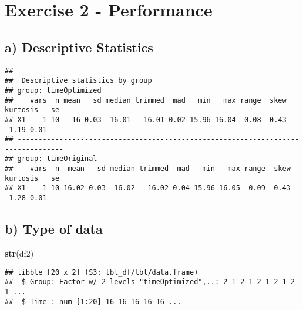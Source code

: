 \documentclass[
]{article}
\newenvironment{Shaded}{\begin{snugshade}}{\end{snugshade}}
\newcommand{\KeywordTok}[1]{\textcolor[rgb]{0.13,0.29,0.53}{\textbf{#1}}}
\newcommand{\NormalTok}[1]{#1}
\newcommand{\OperatorTok}[1]{\textcolor[rgb]{0.81,0.36,0.00}{\textbf{#1}}}
\begin{document}
\hypertarget{exercise-2---performance}{%
\section{Exercise 2 - Performance}\label{exercise-2---performance}}

\hypertarget{a-descriptive-statistics}{%
\subsection{a) Descriptive Statistics}\label{a-descriptive-statistics}}

\begin{Shaded}
\end{Shaded}

\begin{verbatim}
## 
##  Descriptive statistics by group 
## group: timeOptimized
##    vars  n mean   sd median trimmed  mad   min   max range  skew kurtosis   se
## X1    1 10   16 0.03  16.01   16.01 0.02 15.96 16.04  0.08 -0.43    -1.19 0.01
## --------------------------------------------------------------------------------- 
## group: timeOriginal
##    vars  n  mean   sd median trimmed  mad   min   max range  skew kurtosis   se
## X1    1 10 16.02 0.03  16.02   16.02 0.04 15.96 16.05  0.09 -0.43    -1.28 0.01
\end{verbatim}

\hypertarget{b-type-of-data}{%
\subsection{b) Type of data}\label{b-type-of-data}}

\begin{Shaded}
\begin{Highlighting}[]
\KeywordTok{str}\NormalTok{(df2)}
\end{Highlighting}
\end{Shaded}

\begin{verbatim}
## tibble [20 x 2] (S3: tbl_df/tbl/data.frame)
##  $ Group: Factor w/ 2 levels "timeOptimized",..: 2 1 2 1 2 1 2 1 2 1 ...
##  $ Time : num [1:20] 16 16 16 16 16 ...
\end{verbatim}
\end{document}
